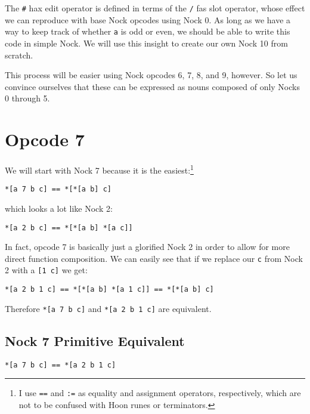 \documentclass[twoside]{article}
\begin{document}
\noindent
The \lstinline[style=inlinecode]{#} hax edit operator is defined in terms of the \lstinline[style=inlinecode]{/} fas slot operator, whose effect we can reproduce with base Nock opcodes using Nock 0.  As long as we have a way to keep track of whether \lstinline[style=inlinecode]{a} is odd or even, we should be able to write this code in simple Nock. We will use this insight to create our own Nock 10 from scratch.

This process will be easier using Nock opcodes 6, 7, 8, and 9, however.  So let us convince ourselves that these can be expressed as nouns composed of only Nocks 0 through 5.

\section{Opcode 7}

We  will start with Nock 7 because it is the easiest:\footnote{I use \texttt{==} and \texttt{:=} as equality and assignment operators, respectively, which are not to be confused with Hoon runes or terminators.}

\begin{lstlisting}[style=listingblock]
*[a 7 b c] == *[*[a b] c]
\end{lstlisting}

\noindent
which looks a lot like Nock 2:

\begin{lstlisting}[style=listingblock]
*[a 2 b c] == *[*[a b] *[a c]]
\end{lstlisting}

In fact, opcode 7 is basically just a glorified Nock 2 in order to allow for more direct function composition.  We can easily see that if we replace our \lstinline[style=inlinecode]{c} from Nock 2 with a \lstinline[style=inlinecode]{[1 c]} we get:

\begin{lstlisting}[style=listingblock]
*[a 2 b 1 c] == *[*[a b] *[a 1 c]] == *[*[a b] c]
\end{lstlisting}

\noindent
Therefore \lstinline[style=inlinecode]{*[a 7 b c]} and \lstinline[style=inlinecode]{*[a 2 b 1 c]} are equivalent.

\subsection{Nock 7 Primitive Equivalent}

\begin{lstlisting}[style=listingblock]
*[a 7 b c] == *[a 2 b 1 c]
\end{lstlisting}
\end{document}
